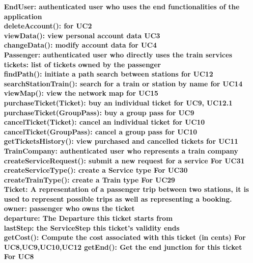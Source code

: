 \bf{EndUser}: authenticated user 
who uses the end functionalities of the application\\
 
deleteAccount(): for UC2\\
viewData(): view personal account data UC3\\
changeData(): modify account data for UC4\\

\bf{Passenger}: authenticated user 
who directly uses the train services\\
 
tickets: list of tickets owned by the passenger\\
findPath(): initiate a path search between stations for UC12\\
searchStationTrain(): search for a train or station by name for UC14\\
viewMap(): view the network map for UC15\\
purchaseTicket(Ticket): buy an individual ticket for UC9, UC12.1\\
purchaseTicket(GroupPass): buy a group pass for UC9\\
cancelTicket(Ticket): cancel an individual ticket for UC10\\
cancelTicket(GroupPass): cancel a group pass for UC10\\
getTicketsHistory(): view purchased and cancelled tickets for UC11\\

\bf{TrainCompany}: authenticated user who represents a train company 
createServiceRequest(): submit a new request for a service 
For UC31\\
createServiceType(): create a Service type
For UC30\\
createTrainType(): create a Train type
For UC29\\

\bf{Ticket}: A representation of a passenger trip between two stations, it is used to represent possible trips as well as representing a booking.\\

owner: passenger who owns the ticket\\
departure: The Departure this ticket starts from\\
lastStep: the ServiceStep this ticket's validity ends\\
getCost(): Compute the cost associated with this ticket (in cents)
For UC8,UC9,UC10,UC12
getEnd(): Get the end junction for this ticket
For UC8

